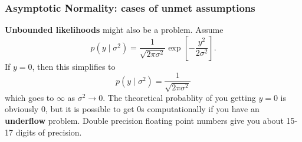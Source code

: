 \documentclass{beamer}
\begin{document}
\begin{frame}
\frametitle{Asymptotic Normality: cases of unmet assumptions}

{\bf Unbounded likelihoods} might also be a problem. Assume 
\[
p(y \mid \sigma^2) = \frac{1}{\sqrt{2 \pi \sigma^2}}\exp\left[ -\frac{y^2}{2 \sigma^2} \right].
\]
If $y=0$, then this simplifies to
\[
p(y \mid \sigma^2) = \frac{1}{\sqrt{2 \pi \sigma^2}}
\]
which goes to $\infty$ as $\sigma^2 \to 0$. The theoretical probablity of you getting $y=0$ is obviously $0$, but it is possible to get $0$s computationally if you have an {\bf underflow} problem. Double precision floating point numbers give you about 15-17 digits of precision. 


\end{frame}
\end{document}
